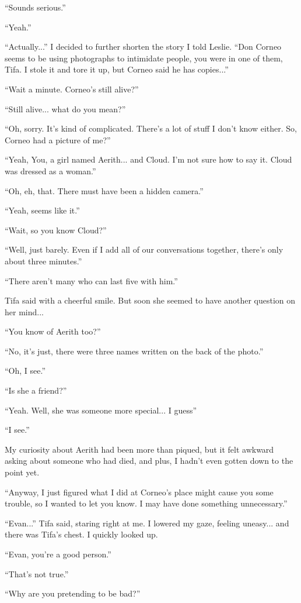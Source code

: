 \documentclass[oneside]{book}
\begin{document}
“Sounds serious.”

“Yeah.”

“Actually...” I decided to further shorten the story I told Leslie. “Don Corneo seems to be using photographs to intimidate people, you were in one of them, Tifa. I stole it and tore it up, but Corneo said he has copies...”

“Wait a minute. Corneo’s still alive?”

“Still alive... what do you mean?”

“Oh, sorry. It’s kind of complicated. There’s a lot of stuff I don’t know either. So, Corneo had a picture of me?”

“Yeah, You, a girl named Aerith... and Cloud. I’m not sure how to say it. Cloud was dressed as a woman.”

“Oh, eh, that. There must have been a hidden camera.”

“Yeah, seems like it.”

“Wait, so you know Cloud?”

“Well, just barely. Even if I add all of our conversations together, there’s only about three minutes.”

“There aren’t many who can last five with him.”

Tifa said with a cheerful smile. But soon she seemed to have another question on her mind...

“You know of Aerith too?”

“No, it’s just, there were three names written on the back of the photo.”

“Oh, I see.”

“Is she a friend?”

“Yeah. Well, she was someone more special... I guess”

“I see.”

My curiosity about Aerith had been more than piqued, but it felt awkward asking about someone who had died, and plus, I hadn’t even gotten down to the point yet.

“Anyway, I just figured what I did at Corneo’s place might cause you some trouble, so I wanted to let you know. I may have done something unnecessary.”

“Evan...” Tifa said, staring right at me. I lowered my gaze, feeling uneasy... and there was Tifa’s chest. I quickly looked up.

“Evan, you’re a good person.”

“That’s not true.”

“Why are you pretending to be bad?”
\end{document}
